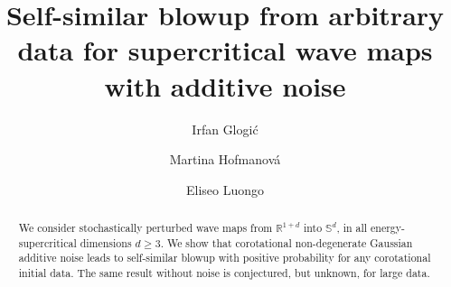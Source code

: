\documentclass[12pt,reqno]{amsart}
\title[]{Self-similar blowup from arbitrary data for supercritical wave maps with additive noise
}
\author{Irfan Glogi\'c}
\author{Martina Hofmanov\'a}
\author{Eliseo Luongo}
\theoremstyle{plain}
\theoremstyle{remark}
\theoremstyle{plain}
\theoremstyle{definition}
\numberwithin{equation}{section}
\numberwithin{equation}{section}
\def\R{{\mathbb R}}
\renewcommand{\S}{\mathbb{S}}
\begin{document}
	
	
	\begin{abstract}
		We consider stochastically perturbed wave maps from $\R^{1+d}$ into $\S^d$, in all energy-supercritical dimensions $d \geq 3$.
		We show that corotational non-degenerate Gaussian additive noise leads to self-similar blowup with positive probability for any corotational initial data. The same result without noise is conjectured, but unknown, for large data. 
	\end{abstract}
	
	\maketitle
	\maketitle
\end{document}
